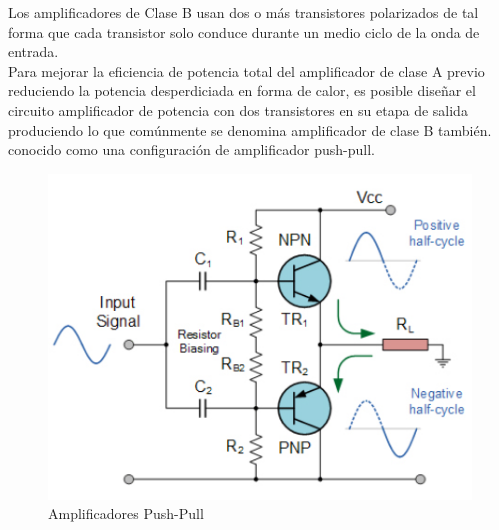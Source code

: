 \documentclass[12pt,a4paper]{article}
\begin{document}
Los amplificadores de Clase B usan dos o más transistores polarizados de tal forma que cada transistor solo conduce durante un medio ciclo de la onda de entrada.\\
Para mejorar la eficiencia de potencia total del amplificador de clase A previo reduciendo la potencia desperdiciada en forma de calor, es posible diseñar el circuito amplificador de potencia con dos transistores en su etapa de salida produciendo lo que comúnmente se denomina amplificador de clase B también. conocido como una configuración de amplificador push-pull.\\
\begin{figure}[hbtp]
\centering
\includegraphics[scale=0.35]{Pictures/0.jpg}
\caption{Amplificadores Push-Pull}
\end{figure}


\newpage
\end{document}
